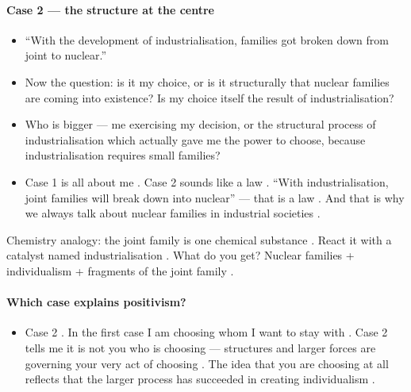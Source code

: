\paragraph{Case 2 --- the structure at the centre}
\begin{itemize}
    \item ``With the development of industrialisation, families got broken down from joint to nuclear.'' 
    \item Now the question: is it my choice, or is it structurally that nuclear families are coming into existence? Is my choice itself the result of industrialisation? 
    \item Who is bigger --- me exercising my decision, or the structural process of industrialisation which actually gave me the power to choose, because industrialisation requires small families? 
    \item Case 1 is all about me . Case 2 sounds like a law . ``With industrialisation, joint families will break down into nuclear'' --- that is a law . And that is why we always talk about nuclear families in industrial societies .
\end{itemize}

\begin{ExampleBox}
Chemistry analogy: the joint family is one chemical substance . React it with a catalyst named industrialisation . What do you get? Nuclear families + individualism + fragments of the joint family .
\end{ExampleBox}

\paragraph{Which case explains positivism?}
\begin{itemize}
    \item Case 2 . In the first case I am choosing whom I want to stay with . Case 2 tells me it is not you who is choosing --- structures and larger forces are governing your very act of choosing . The idea that you are choosing at all reflects that the larger process has succeeded in creating individualism .
\end{itemize}

